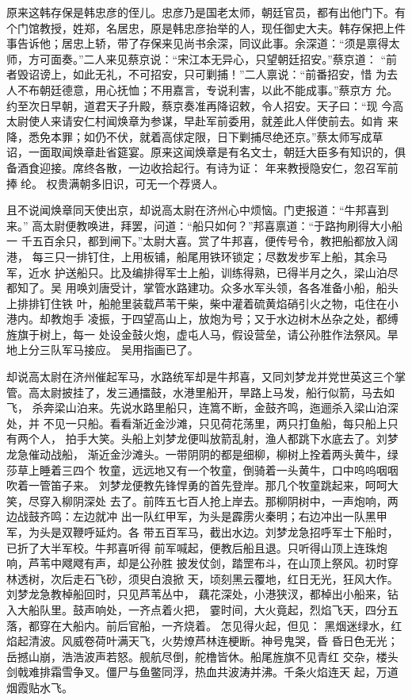 原来这韩存保是韩忠彦的侄儿。忠彦乃是国老太师，朝廷官员，都有出他门下。有
个门馆教授，姓郑，名居忠，原是韩忠彦抬举的人，现任御史大夫。韩存保把上件
事告诉他；居忠上轿，带了存保来见尚书余深，同议此事。余深道：“须是禀得太
师，方可面奏。”二人来见蔡京说：“宋江本无异心，只望朝廷招安。”蔡京道：
“前者毁诏谤上，如此无礼，不可招安，只可剿捕！”二人禀说：“前番招安，惜
为去人不布朝廷德意，用心抚恤；不用嘉言，专说利害，以此不能成事。”蔡京方
允。约至次日早朝，道君天子升殿，蔡京奏准再降诏敕，令人招安。天子曰：“现
今高太尉使人来请安仁村闻焕章为参谋，早赴军前委用，就差此人伴使前去。如肯
来降，悉免本罪；如仍不伏，就着高俅定限，日下剿捕尽绝还京。”蔡太师写成草
诏，一面取闻焕章赴省筵宴。原来这闻焕章是有名文士，朝廷大臣多有知识的，俱
备酒食迎接。席终各散，一边收拾起行。有诗为证：
年来教授隐安仁，忽召军前捧纶。
权贵满朝多旧识，可无一个荐贤人。

且不说闻焕章同天使出京，却说高太尉在济州心中烦恼。门吏报道：“牛邦喜到来。”
高太尉便教唤进，拜罢，问道：“船只如何？”邦喜禀道：“于路拘刷得大小船一
千五百余只，都到闸下。”太尉大喜。赏了牛邦喜，便传号令，教把船都放入阔港，
每三只一排钉住，上用板铺，船尾用铁环锁定；尽数发步军上船，其余马军，近水
护送船只。比及编排得军士上船，训练得熟，已得半月之久，梁山泊尽都知了。吴
用唤刘唐受计，掌管水路建功。众多水军头领，各各准备小船，船头上排排钉住铁
叶，船舱里装载芦苇干柴，柴中灌着硫黄焰硝引火之物，屯住在小港内。却教炮手
凌振，于四望高山上，放炮为号；又于水边树木丛杂之处，都缚旌旗于树上，每一
处设金鼓火炮，虚屯人马，假设营垒，请公孙胜作法祭风。旱地上分三队军马接应。
吴用指画已了。

却说高太尉在济州催起军马，水路统军却是牛邦喜，又同刘梦龙并党世英这三个掌
管。高太尉披挂了，发三通擂鼓，水港里船开，旱路上马发，船行似箭，马去如飞，
杀奔梁山泊来。先说水路里船只，连篙不断，金鼓齐鸣，迤逦杀入梁山泊深处，并
不见一只船。看看渐近金沙滩，只见荷花荡里，两只打鱼船，每只船上只有两个人，
拍手大笑。头船上刘梦龙便叫放箭乱射，渔人都跳下水底去了。刘梦龙急催动战船，
渐近金沙滩头。一带阴阴的都是细柳，柳树上拴着两头黄牛，绿莎草上睡着三四个
牧童，远远地又有一个牧童，倒骑着一头黄牛，口中呜呜咽咽吹着一管笛子来。
刘梦龙便教先锋悍勇的首先登岸。那几个牧童跳起来，呵呵大笑，尽穿入柳阴深处
去了。前阵五七百人抢上岸去。那柳阴树中，一声炮响，两边战鼓齐鸣：左边就冲
出一队红甲军，为头是霹雳火秦明；右边冲出一队黑甲军，为头是双鞭呼延灼。各
带五百军马，截出水边。刘梦龙急招呼军士下船时，已折了大半军校。牛邦喜听得
前军喊起，便教后船且退。只听得山顶上连珠炮响，芦苇中飕飕有声，却是公孙胜
披发仗剑，踏罡布斗，在山顶上祭风。初时穿林透树，次后走石飞砂，须臾白浪掀
天，顷刻黑云覆地，红日无光，狂风大作。刘梦龙急教棹船回时，只见芦苇丛中，
藕花深处，小港狭汊，都棹出小船来，钻入大船队里。鼓声响处，一齐点着火把，
霎时间，大火竟起，烈焰飞天，四分五落，都穿在大船内。前后官船，一齐烧着。
怎见得火起，但见：
黑烟迷绿水，红焰起清波。风威卷荷叶满天飞，火势燎芦林连梗断。神号鬼哭，昏
昏日色无光；岳撼山崩，浩浩波声若怒。舰航尽倒，舵橹皆休。船尾旌旗不见青红
交杂，楼头剑戟难排霜雪争叉。僵尸与鱼鳖同浮，热血共波涛并沸。千条火焰连天
起，万道烟霞贴水飞。

